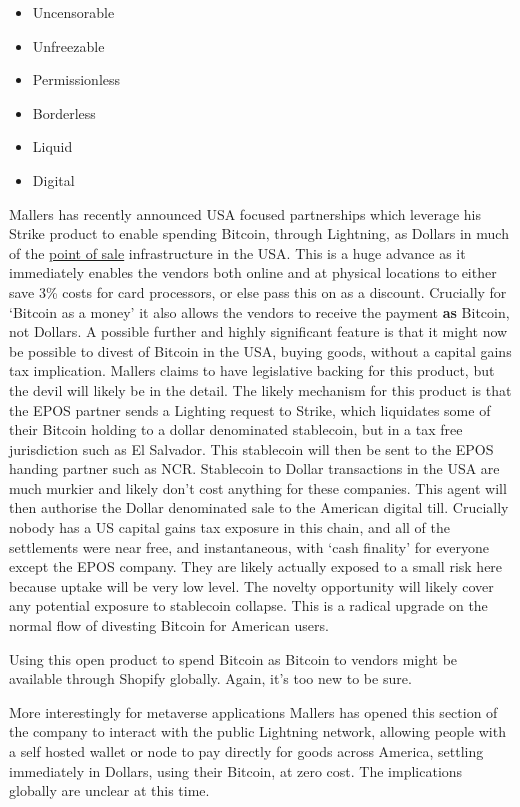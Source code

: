 \begin{itemize}
\item Uncensorable
\item Unfreezable
\item Permissionless
\item Borderless
\item Liquid
\item Digital
\end{itemize}
Mallers has recently announced USA focused partnerships which leverage his Strike product to enable spending Bitcoin, through Lightning, as Dollars in much of the \href{https://www.ncr.com/point-of-sale-pos-systems}{point of sale} infrastructure in the USA. This is a huge advance as it immediately enables the vendors both online and at physical locations to either save 3\% costs for card processors, or else pass this on as a discount. Crucially for `Bitcoin as a money' it also allows the vendors to receive the payment \textbf{as} Bitcoin, not Dollars. A possible further and highly significant feature is that it might now be possible to divest of Bitcoin in the USA, buying goods, without a capital gains tax implication. Mallers claims to have legislative backing for this product, but the devil will likely be in the detail. The likely mechanism for this product is that the EPOS partner sends a Lighting request to Strike, which liquidates some of their Bitcoin holding to a dollar denominated stablecoin, but in a tax free jurisdiction such as El Salvador. This stablecoin will then be sent to the EPOS handing partner such as NCR. Stablecoin to Dollar transactions in the USA are much murkier and likely don't cost anything for these companies. This agent will then authorise the Dollar denominated sale to the American digital till. Crucially nobody has a US capital gains tax exposure in this chain, and all of the settlements were near free, and instantaneous, with `cash finality' for everyone except the EPOS company. They are likely actually exposed to a small risk here because uptake will be very low level. The novelty opportunity will likely cover any potential exposure to stablecoin collapse. This is a radical upgrade on the normal flow of divesting Bitcoin for American users. \par
Using this open product to spend Bitcoin as Bitcoin to vendors might be available through Shopify globally. Again, it's too new to be sure.\par
More interestingly for metaverse applications Mallers has opened this section of the company to interact with the public Lightning network, allowing people with a self hosted wallet or node to pay directly for goods across America, settling immediately in Dollars, using their Bitcoin, at zero cost. The implications globally are unclear at this time.\par
